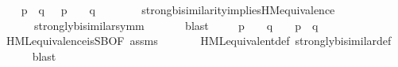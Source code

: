 \begin{isabellebody}
\isamarkupfalse%
\isanewline
\ \ \isamarkupfalse%
\ {\isacartoucheopen}{\isacharparenleft}{\kern0pt}p\ {\isasymleftrightarrow}\ q{\isacharparenright}{\kern0pt}\ {\isasymLongrightarrow}\ {\isasymforall}{\isasymphi}{\isachardot}{\kern0pt}\ {\isacharparenleft}{\kern0pt}p\ {\isasymTurnstile}\ {\isasymphi}{\isacharparenright}{\kern0pt}\ {\isacharequal}{\kern0pt}\ {\isacharparenleft}{\kern0pt}q\ {\isasymTurnstile}\ {\isasymphi}{\isacharparenright}{\kern0pt}{\isacartoucheclose}\isanewline
\ \ \ \ \isamarkupfalse%
\ strong{\isacharunderscore}{\kern0pt}bisimilarity{\isacharunderscore}{\kern0pt}implies{\isacharunderscore}{\kern0pt}HM{\isacharunderscore}{\kern0pt}equivalence\ \isanewline
\ \ \ \ \ \ strongly{\isacharunderscore}{\kern0pt}bisimilar{\isacharunderscore}{\kern0pt}symm\ \isanewline
\ \ \ \ \isamarkupfalse%
\ blast\isanewline
{}\isamarkupfalse%
\isanewline
\ \ \isamarkupfalse%
\ {\isacartoucheopen}{\isasymforall}{\isasymphi}{\isachardot}{\kern0pt}\ {\isacharparenleft}{\kern0pt}p\ {\isasymTurnstile}\ {\isasymphi}{\isacharparenright}{\kern0pt}\ {\isacharequal}{\kern0pt}\ {\isacharparenleft}{\kern0pt}q\ {\isasymTurnstile}\ {\isasymphi}{\isacharparenright}{\kern0pt}\ {\isasymLongrightarrow}\ {\isacharparenleft}{\kern0pt}p\ {\isasymleftrightarrow}\ q{\isacharparenright}{\kern0pt}{\isacartoucheclose}\ \isanewline
\ \ \ \ \isamarkupfalse%
\ HML{\isacharunderscore}{\kern0pt}equivalence{\isacharunderscore}{\kern0pt}is{\isacharunderscore}{\kern0pt}SB{\isacharbrackleft}{\kern0pt}OF\ assms{\isacharbrackright}{\kern0pt}\ \isanewline
\ \ \ \ \ \ HML{\isacharunderscore}{\kern0pt}equivalent{\isacharunderscore}{\kern0pt}def\ strongly{\isacharunderscore}{\kern0pt}bisimilar{\isacharunderscore}{\kern0pt}def\ \isanewline
\ \ \ \ \isamarkupfalse%
\ blast\isanewline
{}\isamarkupfalse%
%
\endisatagvisible
{\isafoldvisible}%
%
\isadelimvisible
%
\endisadelimvisible
\isanewline
\isanewline
{}\isamarkupfalse%
\ %
%
\isadelimtheory
%
\endisadelimtheory
%
\isatagtheory
%
\endisatagtheory
{\isafoldtheory}%
%
\isadelimtheory
%
\endisadelimtheory
%
\end{isabellebody}%
\endinput
